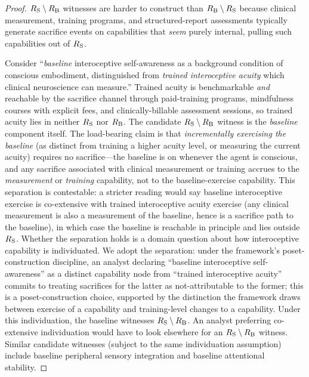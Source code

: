 \begin{proof}
$R_{\mathrm{S}} \setminus R_{\mathrm{B}}$ witnesses are harder to construct
than $R_{\mathrm{B}} \setminus R_{\mathrm{S}}$ because clinical measurement,
training programs, and structured-report assessments
typically generate sacrifice events on capabilities that
\emph{seem} purely internal, pulling such capabilities out of
$R_{\mathrm{S}}$.

Consider ``\emph{baseline} interoceptive self-awareness as a
background condition of conscious embodiment, distinguished
from \emph{trained interoceptive acuity} which clinical
neuroscience can measure.''  Trained acuity is benchmarkable
\emph{and} reachable by the sacrifice channel through
paid-training programs, mindfulness courses with explicit fees,
and clinically-billable assessment sessions, so trained acuity
lies in neither $R_{\mathrm{S}}$ nor $R_{\mathrm{B}}$.  The candidate
$R_{\mathrm{S}} \setminus R_{\mathrm{B}}$ witness is the \emph{baseline}
component itself.  The load-bearing claim is that
\emph{incrementally exercising the baseline} (as distinct from
training a higher acuity level, or measuring the current
acuity) requires no sacrifice---the baseline is on whenever
the agent is conscious, and any sacrifice associated with
clinical measurement or training accrues to the
\emph{measurement} or \emph{training} capability, not to the
baseline-exercise capability.  This separation is contestable:
a stricter reading would say baseline interoceptive exercise
is co-extensive with trained interoceptive acuity exercise
(any clinical measurement is also a measurement of the
baseline, hence is a sacrifice path to the baseline), in which
case the baseline is reachable in principle and lies outside
$R_{\mathrm{S}}$.  Whether the separation holds is a domain question
about how interoceptive capability is individuated.  We
adopt the separation: under the framework's poset-construction
discipline, an analyst declaring ``baseline interoceptive
self-awareness'' as a distinct capability node from
``trained interoceptive acuity'' commits to treating
sacrifices for the latter as not-attributable to the former;
this is a poset-construction choice, supported by the
distinction the framework draws between exercise of a
capability and training-level changes to a capability.  Under
this individuation, the baseline witnesses
$R_{\mathrm{S}} \setminus R_{\mathrm{B}}$.  An analyst preferring co-extensive
individuation would have to look elsewhere for an
$R_{\mathrm{S}} \setminus R_{\mathrm{B}}$ witness.  Similar candidate witnesses
(subject to the same individuation assumption) include
baseline peripheral sensory integration and baseline
attentional stability.


\end{proof}
